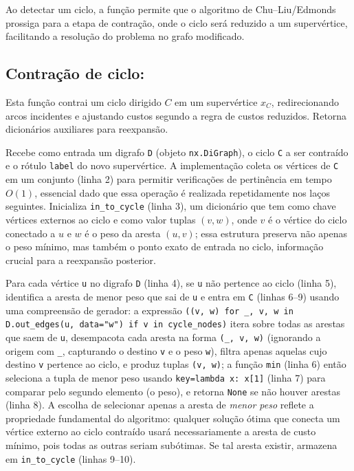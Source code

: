 Ao detectar um ciclo, a função permite que o algoritmo de Chu–Liu/Edmonds prossiga para a etapa de contração, onde o ciclo será reduzido a um supervértice, facilitando a resolução do problema no grafo modificado.

\subsection{Contração de ciclo:}
Esta função contrai um ciclo dirigido \(C\) em um supervértice \(x_C\), redirecionando arcos incidentes e ajustando custos segundo a regra de custos reduzidos. Retorna dicionários auxiliares para reexpansão.

Recebe como entrada um digrafo \texttt{D} (objeto \texttt{nx.DiGraph}), o ciclo \texttt{C} a ser contraído e o rótulo \texttt{label} do novo supervértice. A implementação coleta os vértices de \texttt{C} em um conjunto (linha 2) para permitir verificações de pertinência em tempo \(O(1)\), essencial dado que essa operação é realizada repetidamente nos laços seguintes. Inicializa \texttt{in\_to\_cycle} (linha 3), um dicionário que tem como chave vértices externos ao ciclo e como valor tuplas \((v,w)\), onde \(v\) é o vértice do ciclo conectado a \(u\) e \(w\) é o peso da aresta \((u,v)\); essa estrutura preserva não apenas o peso mínimo, mas também o ponto exato de entrada no ciclo, informação crucial para a reexpansão posterior.

Para cada vértice \texttt{u} no digrafo \texttt{D} (linha 4), se \texttt{u} não pertence ao ciclo (linha 5), identifica a aresta de menor peso que sai de \texttt{u} e entra em \texttt{C} (linhas 6--9) usando uma compreensão de gerador: a expressão \texttt{((v, w) for \_, v, w in D.out\_edges(u, data="w") if v in cycle\_nodes)} itera sobre todas as arestas que saem de \texttt{u}, desempacota cada aresta na forma \texttt{(\_, v, w)} (ignorando a origem com \texttt{\_}, capturando o destino \texttt{v} e o peso \texttt{w}), filtra apenas aquelas cujo destino \texttt{v} pertence ao ciclo, e produz tuplas \texttt{(v, w)}; a função \texttt{min} (linha 6) então seleciona a tupla de menor peso usando \texttt{key=lambda x: x[1]} (linha 7) para comparar pelo segundo elemento (o peso), e retorna \texttt{None} se não houver arestas (linha 8). A escolha de selecionar apenas a aresta de \emph{menor peso} reflete a propriedade fundamental do algoritmo: qualquer solução ótima que conecta um vértice externo ao ciclo contraído usará necessariamente a aresta de custo mínimo, pois todas as outras seriam subótimas. Se tal aresta existir, armazena em \texttt{in\_to\_cycle} (linhas 9--10).

